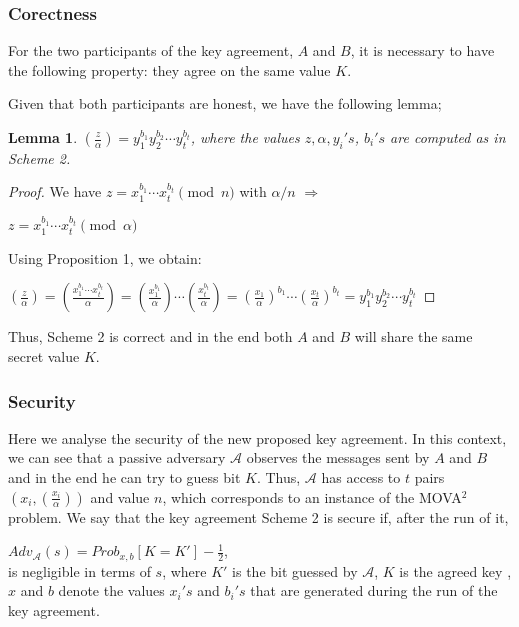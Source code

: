 \documentclass[11pt, a4paper, twoside, openright]{report}
\newtheorem{lemma}{Lemma}
\begin{document}
		\subsubsection{Corectness}
			
			For the two participants of the key agreement, $A$ and $B$, it is necessary to have the following property: they agree on the same value 
			$K$. 
			
			Given that both participants are honest, we have the following lemma;
			
			\begin{lemma}
				$(\frac{z}{\alpha})= y_1^{b_1}y_2^{b_2} \cdots y_t^{b_t}$, where the values $z, \alpha, y_i's$, $b_i's$ are computed as in Scheme 2. 
			\end{lemma}	
			\begin{proof}
				We have $z= x_1^{b_1} \cdots x_t^{b_t} \pmod{n}$ with $\alpha / n$ $\Rightarrow$
				
				\hspace{30mm} $z= x_1^{b_1} \cdots x_t^{b_t} \pmod{\alpha}$
				
				Using Proposition 1, we obtain:
				
				$(\frac{z}{\alpha})= (\frac{x_1^{b_1} \cdots x_t^{b_t}}{\alpha}) = (\frac{x_1^{b_1}}{\alpha}) \cdots (\frac{x_t^{b_t}}{\alpha})=
				(\frac{x_1}{\alpha})^{b_1} \cdots (\frac{x_t}{\alpha})^{b_t} = y_1^{b_1}y_2^{b_2} \cdots y_t^{b_t}$
				
			\end{proof}
			
			Thus, Scheme 2 is correct and in the end both $A$ and $B$ will share the same secret value $K$. 
			
		\subsubsection{Security}
			Here we analyse the security of the new proposed key agreement. In this context, we can see that a passive adversary $\mathcal{A}$
			observes the messages sent by $A$ and $B$ and in the end he can try to guess bit $K$. Thus, $\mathcal{A}$ has 
			access to $t$ pairs $(x_i, (\frac{x_i}{\alpha}))$ and value $n$, which corresponds to an instance of the 
			MOVA$^2$ problem. 
			We say that the key agreement Scheme 2
			is secure if, after the run of it,
			
			\hspace{10mm} $Adv_{\mathcal{A}}(s) = Prob_{x,b} [K = K'] - \frac{1}{2}$,  \\
			is negligible in terms of $s$, where $K'$ is the bit guessed by $\mathcal{A}$, $K$ is the agreed key
			, $x$ and $b$ denote the values $x_i's$ and $b_i's$ that are generated during the run of the key agreement. 
			
\end{document}
